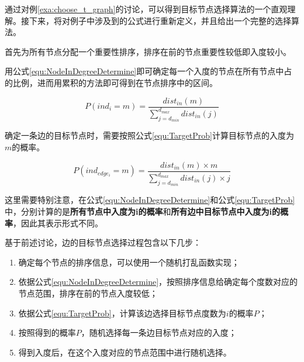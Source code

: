 通过对例\ref{exa:choose_t_graph}的讨论，可以得到目标节点选择算法的一个直观理解。接下来，将对例子中涉及到的公式进行重新定义，并且给出一个完整的选择算法。



首先为所有节点分配一个重要性排序，排序在前的节点重要性较低即入度较小。

用公式\ref{equ:NodeInDegreeDetermine}即可确定每一个入度的节点在所有节点中占的比例，进而用累积的方法即可得到在节点排序中的区间。

\begin{equation}
  \label{equ:NodeInDegreeDetermine}
  P\left(ind_i=m\right)=\frac{dist_{in}(m)}{\sum\limits_{j=d_{min}}^{d_{max}}dist_{in}(j)}
\end{equation}

确定一条边的目标节点时，需要按照公式\ref{equ:TargetProb}计算目标节点的入度为$m$的概率。

\begin{equation}
  \label{equ:TargetProb}
  P\left(ind_{edge_i}=m\right)=\frac{dist_{in}(m) \times m}{\sum\limits_{j=d_{min}}^{d_{max}}dist_{in}(j)\times j}
\end{equation}

这里需要特别注意，在公式\ref{equ:NodeInDegreeDetermine}和公式\ref{equ:TargetProb}中，分别计算的是\textbf{所有节点中入度为i的概率}和\textbf{所有边中目标节点中入度为i的概率}，因此其表示形式不同。

基于前述讨论，边的目标节点选择过程包含以下几步：

\begin{enumerate}
  \item 确定每个节点的排序信息，可以使用一个随机打乱函数实现；
  \item 依据公式\ref{equ:NodeInDegreeDetermine}，按照排序信息给确定每个度数对应的节点范围，排序在前的节点入度较低；
  \item 依据公式\ref{equ:TargetProb}，计算该边选择目标节点度数为$i$的概率$P$；
  \item 按照得到的概率$P$，随机选择每一条边目标节点对应的入度；
  \item 得到入度后，在这个入度对应的节点范围中进行随机选择。
\end{enumerate}

